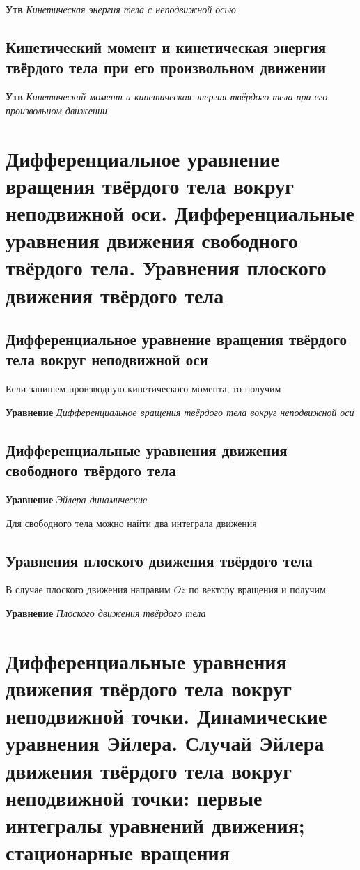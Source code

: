 \documentclass[a4paper, 14pt]{article}
\begin{document}
    \textbf{Утв} \textit{Кинетическая энергия тела с неподвижной осью}
    
    \subsection{Кинетический момент и кинетическая энергия твёрдого тела при его произвольном движении}
    
    \textbf{Утв} \textit{Кинетический момент и кинетическая энергия твёрдого тела при его произвольном движении}
    
    \section{Дифференциальное уравнение вращения твёрдого тела вокруг неподвижной оси.
    Дифференциальные уравнения движения свободного твёрдого тела.
    Уравнения плоского движения твёрдого тела}
    
    \subsection{Дифференциальное уравнение вращения твёрдого тела вокруг неподвижной оси}
    
    Если запишем производную кинетического момента, то получим
    
    \textbf{Уравнение} \textit{Дифференциальное вращения твёрдого тела вокруг неподвижной оси}
    
    \subsection{Дифференциальные уравнения движения свободного твёрдого тела}
    
    \textbf{Уравнение} \textit{Эйлера динамические}
    
    Для свободного тела можно найти два интеграла движения
    
    \subsection{Уравнения плоского движения твёрдого тела}
    
    В случае плоского движения направим $Oz$ по вектору вращения и получим
    
    \textbf{Уравнение} \textit{Плоского движения твёрдого тела}
    
    \section{Дифференциальные уравнения движения твёрдого тела вокруг неподвижной точки. Динамические уравнения Эйлера.
    Случай Эйлера движения твёрдого тела вокруг неподвижной точки: первые интегралы уравнений движения; стационарные
    вращения}
    
\end{document}
